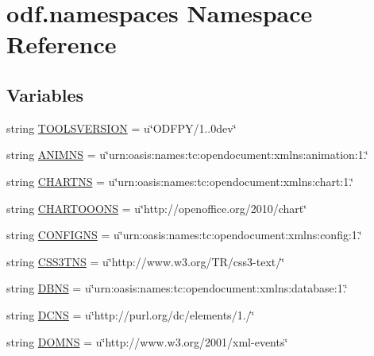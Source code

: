 \hypertarget{namespaceodf_1_1namespaces}{\section{odf.\+namespaces Namespace Reference}
\label{namespaceodf_1_1namespaces}
}
\subsection*{Variables}
\begin{DoxyCompactItemize}
\item 
string \hyperlink{namespaceodf_1_1namespaces_a736381c711ff84b4eb1438250d37c47c}{T\+O\+O\+L\+S\+V\+E\+R\+S\+I\+O\+N} = u\char`\"{}O\+D\+F\+P\+Y/1..\+0dev\char`\"{}
\item 
string \hyperlink{namespaceodf_1_1namespaces_a799446ad85a3db054a63ef0c7eb613a6}{A\+N\+I\+M\+N\+S} = u\char`\"{}urn\+:oasis\+:names\+:tc\+:opendocument\+:xmlns\+:animation\+:1.\char`\"{}
\item 
string \hyperlink{namespaceodf_1_1namespaces_abcad86ac6d4ff8db343d42fe9d81cf69}{C\+H\+A\+R\+T\+N\+S} = u\char`\"{}urn\+:oasis\+:names\+:tc\+:opendocument\+:xmlns\+:chart\+:1.\char`\"{}
\item 
string \hyperlink{namespaceodf_1_1namespaces_a94cf86979bbde22bd25d4a867f6329df}{C\+H\+A\+R\+T\+O\+O\+O\+N\+S} = u\char`\"{}http\+://openoffice.\+org/2010/chart\char`\"{}
\item 
string \hyperlink{namespaceodf_1_1namespaces_aa10cc99f2e65577ec7fa203cf7c7be34}{C\+O\+N\+F\+I\+G\+N\+S} = u\char`\"{}urn\+:oasis\+:names\+:tc\+:opendocument\+:xmlns\+:config\+:1.\char`\"{}
\item 
string \hyperlink{namespaceodf_1_1namespaces_a72fa2c70a996fefada2f9b239b2a3847}{C\+S\+S3\+T\+N\+S} = u\char`\"{}http\+://www.\+w3.\+org/T\+R/css3-\/text/\char`\"{}
\item 
string \hyperlink{namespaceodf_1_1namespaces_a8af54ab4f35bb100600ecebb18bef049}{D\+B\+N\+S} = u\char`\"{}urn\+:oasis\+:names\+:tc\+:opendocument\+:xmlns\+:database\+:1.\char`\"{}
\item 
string \hyperlink{namespaceodf_1_1namespaces_abc0ff10411221c32712c3027f62f8d21}{D\+C\+N\+S} = u\char`\"{}http\+://purl.\+org/dc/elements/1./\char`\"{}
\item 
string \hyperlink{namespaceodf_1_1namespaces_a3bcbd206bb5583e0f7f3a7a4adda46d5}{D\+O\+M\+N\+S} = u\char`\"{}http\+://www.\+w3.\+org/2001/xml-\/events\char`\"{}
\item 

\end{DoxyCompactItemize}
